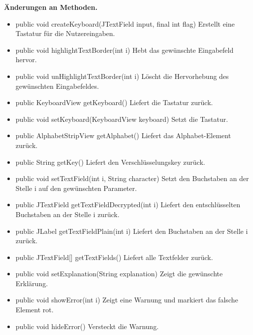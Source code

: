 \documentclass{article}
\begin{document}
    \textbf{Änderungen an Methoden.}
      \begin{itemize}
		\item public void createKeyboard(JTextField input, final int flag)\newline
              Erstellt eine Tastatur für die Nutzereingaben.
		\item public void highlightTextBorder(int i)\newline
              Hebt das gewünschte Eingabefeld hervor.
		\item public void unHighlightTextBorder(int i)\newline
              Löscht die Hervorhebung des gewünschten Eingabefeldes.
		\item public KeyboardView getKeyboard()\newline
              Liefert die Tastatur zurück.
		\item public void setKeyboard(KeyboardView keyboard)\newline
              Setzt die Tastatur.
		\item public AlphabetStripView getAlphabet()\newline
              Liefert das Alphabet-Element zurück.
		\item public String getKey()\newline
              Liefert den Verschlüsselungskey zurück.
		\item public void setTextField(int i, String character)\newline
              Setzt den Buchstaben an der Stelle i auf den gewünschten Parameter.
		\item public JTextField getTextFieldDecrypted(int i)\newline
              Liefert den entschlüsselten Buchstaben an der Stelle i zurück.
		\item public JLabel getTextFieldPlain(int i)\newline
              Liefert den Buchstaben an der Stelle i zurück.
		\item public JTextField[] getTextFields()\newline
              Liefert alle Textfelder zurück.
		\item public void setExplanation(String explanation)\newline
              Zeigt die gewünschte Erklärung.
		\item public void showError(int i)\newline
              Zeigt eine Warnung und markiert das falsche Element rot.
		\item public void hideError()\newline
              Versteckt die Warnung.		
	  \end{itemize}
\end{document}
